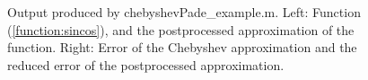\documentclass[12pt]{article}
\begin{document}
\begin{figure}[tbh]
   \centering
 \caption{Output produced by chebyshevPade\_example.m. Left: Function (\ref{function:sincos}), and the postprocessed approximation of the function.  Right: Error of the Chebyshev approximation and the
 reduced error of the postprocessed approximation.
          } \label{fig:chebyPade}
 \end{figure}
 
\end{document}
